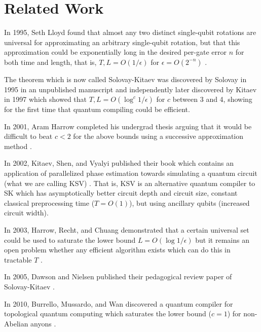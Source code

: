 \section{Related Work}
\label{sec:related}

In 1995, Seth Lloyd found that almost any two distinct single-qubit rotations are
universal for approximating an arbitrary single-qubit rotation, but that this
approximation could be exponentially long in the desired per-gate error $n$
for both time and length, that is,
$T,L = O(1/\epsilon)$ for $\epsilon = O(2^{-n})$ \cite{Lloyd1995}.

The theorem which is now called Solovay-Kitaev was discovered by Solovay in
1995 in an unpublished manuscript and independently later discovered by
Kitaev in 1997 \cite{nc00} which showed that $T,L = O(\log^c{1/\epsilon})$ for
$c$ between 3 and 4, showing for the first time that quantum compiling
could be efficient.

In 2001, Aram Harrow completed his undergrad thesis arguing that it would be difficult
to beat $c < 2$ for the above bounds using a successive approximation
method \cite{harrow01}.

In 2002, Kitaev, Shen, and Vyalyi published their book which contains an
application of parallelized phase estimation towards simulating a quantum
circuit (what we are calling KSV) \cite{ksv02}.
That is, KSV is an alternative quantum compiler to SK which has
asymptotically better circuit depth and circuit size, constant classical
preprocessing time ($T=O(1)$),
but using ancillary qubits (increased circuit width).

In 2003, Harrow, Recht, and Chuang demonstrated that a certain universal
set could be used to saturate the lower bound $L=O(\log{1/\epsilon})$
but it remains an open problem whether any efficient algorithm exists
which can do this in tractable $T$ \cite{hrc02}.

In 2005, Dawson and Nielsen published their pedagogical review
paper of Solovay-Kitaev \cite{Dawson2005}.

In 2010, Burrello, Mussardo, and Wan discovered a quantum compiler for
topological quantum computing which saturates the lower bound ($c=1$) for
non-Abelian anyons \cite{Burrello2010}.

